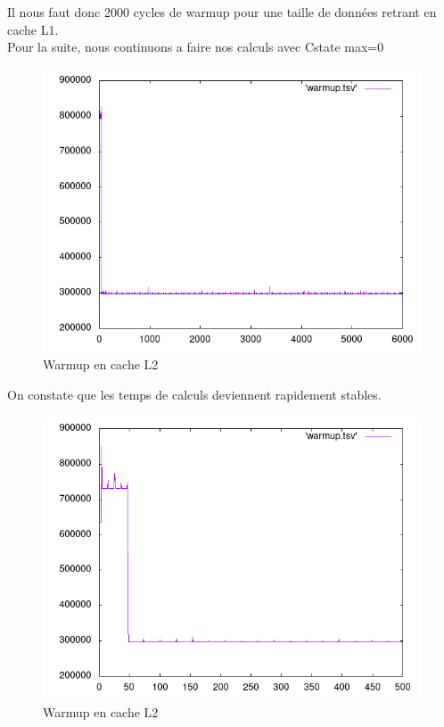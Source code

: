 \documentclass{report}
\begin{document}
Il nous faut donc 2000 cycles de warmup pour une taille de données retrant en cache L1.\\

Pour la suite, nous continuons a faire nos calculs avec Cstate max=0
\newpage
    \begin{figure}[ht!]
        \centering
        \includegraphics[width=120mm]{MEDIA/warmupL2_NOCstate.png}
        \caption{Warmup en cache L2}
    \end{figure}

On constate que les temps de calculs deviennent rapidement stables.

\newpage
    \begin{figure}[ht!]
        \centering
        \includegraphics[width=120mm]{MEDIA/closeup.png}
        \caption{Warmup en cache L2}
    \end{figure}
\end{document}
